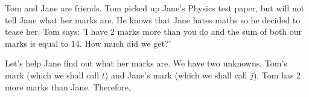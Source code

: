         \label{m39262*id161557}Tom and Jane are friends. Tom picked up Jane's Physics test paper, but will not tell Jane what her marks are. He knows that Jane hates maths so he decided to tease her. Tom says: 'I have 2 marks more than you do and the sum of both our marks is equal to 14. How much did we get?'\par 
        \label{m39262*id161565}Let's help Jane find out what her marks are. We have two unknowns, Tom's mark (which we shall call \begin{math}t\end{math}) and Jane's mark (which we shall call \begin{math}j\end{math}). Tom has 2 more marks than Jane. Therefore,\par 
        \label{m39262*id161587}\nopagebreak\noindent{}
    
